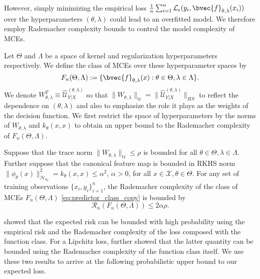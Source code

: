 \documentclass[runningheads, envcountsame, a4paper]{llncs}
\begin{document}
		However, simply minimizing the empirical loss $\frac{1}{n} \sum_{i = 1}^{n} \mathcal{L}_{\epsilon}(y_{i}, \bvec{f}_{\theta, \lambda}(x_{i}))$ over the hyperparameters $(\theta, \lambda)$ could lead to an overfitted model. We therefore employ Rademacher complexity bounds to control the model complexity of \glspl{MCE}.
	
		Let $\Theta$ and $\Lambda$ be a space of kernel and regularization hyperparameters respectively. We define the class of \glspl{MCE} over these hyperparameter spaces by	
		\begin{equation}
			F_{n}(\Theta, \Lambda) := \{ \bvec{f}_{\theta, \lambda}(x) : \theta \in \Theta, \lambda \in \Lambda \}.
		\label{eq:predictor_class_copy}
		\end{equation}
		We denote $W_{\theta, \lambda}^{T} \equiv \hat{\mathcal{U}}^{(\theta, \lambda)}_{Y | X}$ so that $\| W_{\theta, \lambda} \|_{\mathrm{tr}} = \| \hat{\mathcal{U}}^{(\theta, \lambda)}_{Y | X} \|_{HS}$ to reflect the dependence on $(\theta, \lambda)$ and also to emphasize the role it plays as the weights of the decision function. We first restrict the space of hyperparameters by the norms of $W_{\theta, \lambda}$ and $k_{\theta}(x, x)$ to obtain an upper bound to the Rademacher complexity of $F_{n}(\Theta, \Lambda)$.
	
		\begin{theorem}
			\label{thm:rademacher_complexity_bound_copy}
			Suppose that the trace norm $\| W_{\theta, \lambda} \|_{\mathrm{tr}} \leq \rho$ is bounded for all $\theta \in \Theta, \lambda \in \Lambda$. Further suppose that the canonical feature map is bounded in \gls{RKHS} norm $\| \phi_{\theta}(x) \|_{\mathcal{H}_{k_{\theta}}}^{2} = k_{\theta}(x, x) \leq \alpha^{2}$, $\alpha > 0$, for all $x \in \mathcal{X}, \theta \in \Theta$. For any set of training observations $\{x_{i}, y_{i}\}_{i = 1}^{n}$, the Rademacher complexity of the class of \glspl{MCE} $F_{n}(\Theta, \Lambda)$ \eqref{eq:predictor_class_copy} is bounded by
			\begin{equation}
			\mathcal{R}_{n}(F_{n}(\Theta, \Lambda)) \leq 2 \alpha \rho.
			\label{eq:rademacher_complexity_bound_copy}
			\end{equation}
		\end{theorem}
	
		\cite{bartlett2002rademacher} showed that the expected risk can be bounded with high probability using the empirical risk and the Rademacher complexity of the loss composed with the function class. For a Lipchitz loss, \citet{ledoux2013probability} further showed that the latter quantity can be bounded using the Rademacher complexity of the function class itself. We use these two results to arrive at the following probabilistic upper bound to our expected loss.
\end{document}
